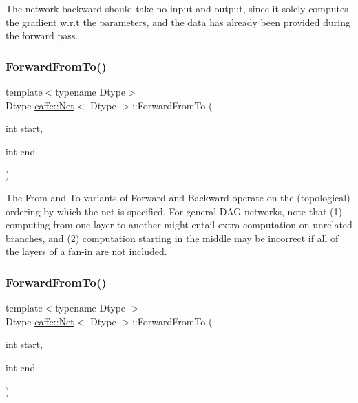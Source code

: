 The network backward should take no input and output, since it solely computes the gradient w.\+r.\+t the parameters, and the data has already been provided during the forward pass. \mbox{\label{classcaffe_1_1_net_ae5354c03371d4cb7b18988561790e676}} 
\subsubsection{\texorpdfstring{Forward\+From\+To()}{ForwardFromTo()}\hspace{0.1cm}{\footnotesize\ttfamily [1/2]}}
{\footnotesize\ttfamily template$<$typename Dtype$>$ \\
Dtype \mbox{\hyperlink{classcaffe_1_1_net}{caffe\+::\+Net}}$<$ Dtype $>$\+::Forward\+From\+To (\begin{DoxyParamCaption}\item[{int}]{start,  }\item[{int}]{end }\end{DoxyParamCaption})}

The From and To variants of Forward and Backward operate on the (topological) ordering by which the net is specified. For general D\+AG networks, note that (1) computing from one layer to another might entail extra computation on unrelated branches, and (2) computation starting in the middle may be incorrect if all of the layers of a fan-\/in are not included. \mbox{\label{classcaffe_1_1_net_ae5354c03371d4cb7b18988561790e676}} 
\subsubsection{\texorpdfstring{Forward\+From\+To()}{ForwardFromTo()}\hspace{0.1cm}{\footnotesize\ttfamily [2/2]}}
{\footnotesize\ttfamily template$<$typename Dtype $>$ \\
Dtype \mbox{\hyperlink{classcaffe_1_1_net}{caffe\+::\+Net}}$<$ Dtype $>$\+::Forward\+From\+To (\begin{DoxyParamCaption}\item[{int}]{start,  }\item[{int}]{end }\end{DoxyParamCaption})}

